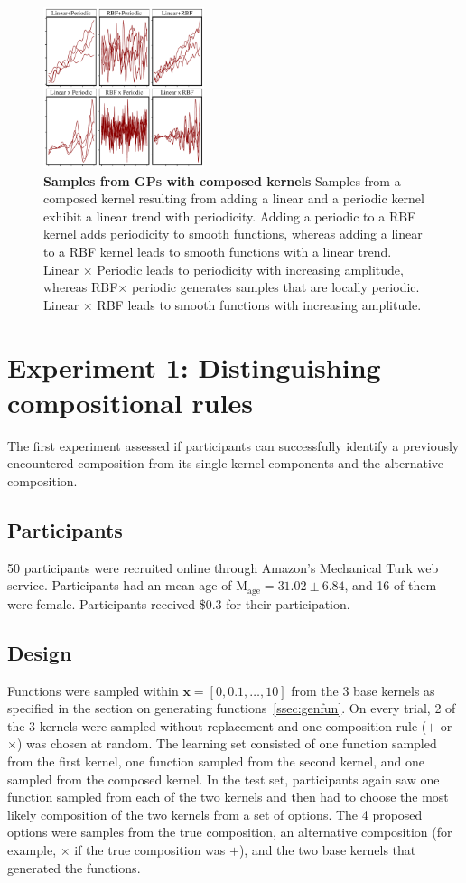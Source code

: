 \documentclass[10pt,letterpaper]{article}
\begin{document}
\begin{figure}[ht!]
\centering
\includegraphics[width=0.42\textwidth]{compexamples.pdf}
\caption{\textbf{Samples from GPs with composed kernels} Samples from a composed kernel resulting from adding a linear and a periodic kernel exhibit a linear trend with periodicity. Adding a periodic to a RBF kernel adds periodicity to smooth functions, whereas adding a linear to a RBF kernel leads to smooth functions with a linear trend. Linear $\times$ Periodic leads to periodicity with increasing amplitude, whereas RBF$\times$ periodic generates samples that are locally periodic. Linear $\times$ RBF leads to smooth functions with increasing amplitude.}
\label{fig:compex}
\end{figure}


\section{Experiment 1: Distinguishing compositional rules}
The first experiment assessed if participants can successfully identify a previously encountered composition from its single-kernel components and the alternative composition.

\subsection{Participants}
50 participants were recruited online through Amazon's Mechanical Turk web service. Participants had an mean age of M$_\text{age}=31.02\pm6.84$, and 16 of them were female. Participants received \$0.3 for their participation. 

\subsection{Design}
Functions were sampled within $\mathbf{x}=[0,0.1,\dots,10]$ from the 3 base kernels as specified in the section on generating functions~\ref{ssec:genfun}. On every trial, 2 of the 3 kernels were sampled without replacement and one composition rule ($+$ or $\times$) was chosen at random. The learning set consisted of one function sampled from the first kernel, one function sampled from the second kernel, and one sampled from the composed kernel. In the test set, participants again saw one function sampled from each of the two kernels and then had to choose the most likely composition of the two kernels from a set of options. The 4 proposed options were samples from the true composition, an alternative composition (for example, $\times$ if the true composition was $+$), and the two base kernels that generated the functions.
\end{document}
